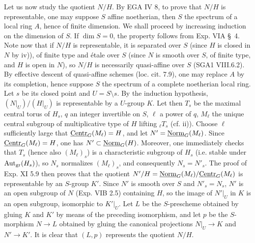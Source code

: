 Let us now study the quotient $N/H$. By EGA IV 8, to prove that $N/H$ is representable, one may suppose $S$ affine noetherian, then $S$ the spectrum of a local ring $A$, hence of finite dimension. We shall proceed by increasing induction on the dimension of $S$. If $\dim S=0$, the property follows from Exp. VIA \S\ 4. Note now that if $N/H$ is representable, it is separated over $S$ (since $H$ is closed in $N$ by iv)), of finite type and étale over $S$ (since $N$ is smooth over $S$, of finite type, and $H$ is open in $N$), so $N/H$ is necessarily quasi-affine over $S$ (SGA1 VIII.6.2). By effective descent of quasi-affine schemes (loc. cit. 7.9), one may replace $A$ by its completion, hence suppose $S$ the spectrum of a complete noetherian local ring. Let $s$ be its closed point and $U=S\setminus s$. By the induction hypothesis, $(N|_U)/(H|_U)$ is representable by a $U$-group $K$. Let then $T_s$ be the maximal central torus of $H_s$, $q$ an integer invertible on $S$, $\ell$ a power of $q$, $M_\ell$ the unique central subgroup of multiplicative type of $H$ lifting ${}_\ell T_s$ (cf. ii)). Choose $\ell$ sufficiently large that $\underline{\mathrm{Centr}}_G(M_\ell)=H$, and let $N'=\underline{\mathrm{Norm}}_G(M_\ell)$. Since $\underline{\mathrm{Centr}}_G(M_\ell)=H$, one has $N'\subset\underline{\mathrm{Norm}}_G(H)$. Moreover, one immediately checks that $T_s$ (hence also $(M_\ell)_s$) is a characteristic subgroup of $H_s$ (i.e. stable under $\operatorname{Aut}_{\mathrm{gr}}(H_s)$), so $N_s$ normalizes $(M_\ell)_s$, and consequently $N_s=N'_s$. The proof of Exp. XI 5.9 then proves that the quotient $N'/H=\underline{\mathrm{Norm}}_G(M_\ell)/\underline{\mathrm{Centr}}_G(M_\ell)$ is representable by an $S$-group $K'$. Since $N'$ is smooth over $S$ and $N'_s=N_s$, $N'$ is an open subgroup of $N$ (Exp. VIB 2.5) containing $H$, so the image of $N'|_U$ in $K$ is an open subgroup, isomorphic to $K'|_U$. Let $L$ be the $S$-prescheme obtained by gluing $K$ and $K'$ by means of the preceding isomorphism, and let $p$ be the $S$-morphism $N\to L$ obtained by gluing the canonical projections $N|_U\to K$ and $N'\to K'$. It is clear that $(L,p)$ represents the quotient $N/H$.

